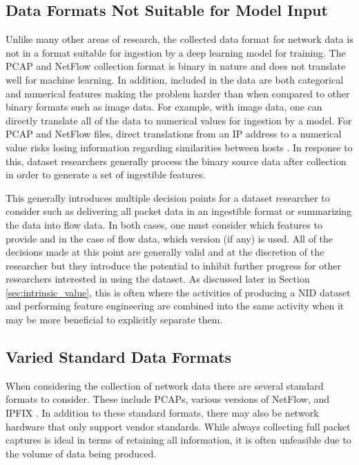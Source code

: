 \documentclass[sigconf, anonymous, screen]{acmart}
\begin{document}
\subsection{Data Formats Not Suitable for Model Input}\label{subsec:collectionformat}
Unlike many other areas of research, the collected data format for network data is not in a format suitable for ingestion by a deep learning model for training.
The PCAP and NetFlow collection format is binary in nature and does not translate well for machine learning.
In addition, included in the data are both categorical and numerical features making the problem harder than when compared to other binary formats such as image data. 
For example, with image data, one can directly translate all of the data to numerical values for ingestion by a model.
For PCAP and NetFlow files, direct translations from an IP address to a numerical value risks losing information regarding similarities between hosts \cite{ringip2vec}.
In response to this, dataset researchers generally process the binary source data after collection in order to generate a set of ingestible features.

This generally introduces multiple decision points for a dataset researcher to consider such as delivering all packet data in an ingestible format or summarizing the data into flow data. 
In both cases, one must consider which features to provide and in the case of flow data, which version (if any) is used.
All of the decisions made at this point are generally valid and at the discretion of the researcher but they introduce the potential to inhibit further progress for other researchers interested in using the dataset.
As discussed later in Section \ref{sec:intrinsic_value}, this is often where the activities of producing a NID dataset and performing feature engineering are combined into the same activity when it may be more beneficial to explicitly separate them.

\subsection{Varied Standard Data Formats}\label{subsec:nostandard}
When considering the collection of network data there are several standard formats to consider.
These include PCAPs, various versions of NetFlow, and IPFIX \cite{claise2008specification}.
In addition to these standard formats, there may also be network hardware that only support vendor standards.
While always collecting full packet captures is ideal in terms of retaining all information, it is often unfeasible due to the volume of data being produced.
\end{document}
